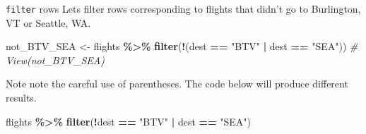 \documentclass[
  ignorenonframetext,
]{beamer}
\newenvironment{Shaded}{\begin{snugshade}}{\end{snugshade}}
\newcommand{\CommentTok}[1]{\textcolor[rgb]{0.56,0.35,0.01}{\textit{#1}}}
\newcommand{\FunctionTok}[1]{\textcolor[rgb]{0.13,0.29,0.53}{\textbf{#1}}}
\newcommand{\NormalTok}[1]{#1}
\newcommand{\OtherTok}[1]{\textcolor[rgb]{0.56,0.35,0.01}{#1}}
\newcommand{\SpecialCharTok}[1]{\textcolor[rgb]{0.81,0.36,0.00}{\textbf{#1}}}
\newcommand{\StringTok}[1]{\textcolor[rgb]{0.31,0.60,0.02}{#1}}
\begin{document}
\begin{frame}[fragile]{\texttt{filter} rows}
\protect\hypertarget{filter-rows-4}{}
Lets filter rows corresponding to flights that didn't go to Burlington,
VT or Seattle, WA.

\normalsize

\begin{Shaded}
\begin{Highlighting}[]
\NormalTok{not\_BTV\_SEA }\OtherTok{\textless{}{-}}\NormalTok{ flights }\SpecialCharTok{\%\textgreater{}\%} 
  \FunctionTok{filter}\NormalTok{(}\SpecialCharTok{!}\NormalTok{(dest }\SpecialCharTok{==} \StringTok{"BTV"} \SpecialCharTok{|}\NormalTok{ dest }\SpecialCharTok{==} \StringTok{"SEA"}\NormalTok{))}
\CommentTok{\# View(not\_BTV\_SEA)}
\end{Highlighting}
\end{Shaded}

\normalsize

Note note the careful use of parentheses. The code below will produce
different results. \normalsize

\begin{Shaded}
\begin{Highlighting}[]
\NormalTok{flights }\SpecialCharTok{\%\textgreater{}\%} 
  \FunctionTok{filter}\NormalTok{(}\SpecialCharTok{!}\NormalTok{dest }\SpecialCharTok{==} \StringTok{"BTV"} \SpecialCharTok{|}\NormalTok{ dest }\SpecialCharTok{==} \StringTok{"SEA"}\NormalTok{)}
\end{Highlighting}
\end{Shaded}

\normalsize
\end{frame}
\end{document}
